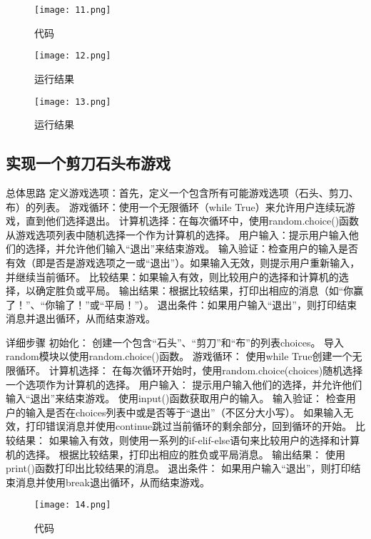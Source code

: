 \documentclass[a4paper, 12pt]{article}
\begin{document}
 
\begin{figure}[H]
  \centering
    \texttt{[image: 11.png]}
  \caption{代码}
   \end{figure}  

    \begin{figure}[H]
  \centering
    \texttt{[image: 12.png]}
  \caption{运行结果}
   \end{figure}  
    \begin{figure}[H]
  \centering
    \texttt{[image: 13.png]}
  \caption{运行结果}
   \end{figure}   
   
\subsection{实现一个剪刀石头布游戏}  

总体思路
定义游戏选项：首先，定义一个包含所有可能游戏选项（石头、剪刀、布）的列表。
游戏循环：使用一个无限循环（while True）来允许用户连续玩游戏，直到他们选择退出。
计算机选择：在每次循环中，使用random.choice()函数从游戏选项列表中随机选择一个作为计算机的选择。
用户输入：提示用户输入他们的选择，并允许他们输入“退出”来结束游戏。
输入验证：检查用户的输入是否有效（即是否是游戏选项之一或“退出”）。如果输入无效，则提示用户重新输入，并继续当前循环。
比较结果：如果输入有效，则比较用户的选择和计算机的选择，以确定胜负或平局。
输出结果：根据比较结果，打印出相应的消息（如“你赢了！”、“你输了！”或“平局！”）。
退出条件：如果用户输入“退出”，则打印结束消息并退出循环，从而结束游戏。

详细步骤
初始化：
创建一个包含“石头”、“剪刀”和“布”的列表choices。
导入random模块以使用random.choice()函数。
游戏循环：
使用while True创建一个无限循环。
计算机选择：
在每次循环开始时，使用random.choice(choices)随机选择一个选项作为计算机的选择。
用户输入：
提示用户输入他们的选择，并允许他们输入“退出”来结束游戏。
使用input()函数获取用户的输入。
输入验证：
检查用户的输入是否在choices列表中或是否等于“退出”（不区分大小写）。
如果输入无效，打印错误消息并使用continue跳过当前循环的剩余部分，回到循环的开始。
比较结果：
如果输入有效，则使用一系列的if-elif-else语句来比较用户的选择和计算机的选择。
根据比较结果，打印出相应的胜负或平局消息。
输出结果：
使用print()函数打印出比较结果的消息。
退出条件：
如果用户输入“退出”，则打印结束消息并使用break退出循环，从而结束游戏。

\begin{figure}[H]
  \centering
    \texttt{[image: 14.png]}
  \caption{代码}
   \end{figure}  
\end{document}
